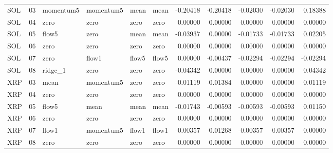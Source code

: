 \begin{longtable}{llllllrrrrr}
SOL & 03 & momentum5 & momentum5 & mean & mean & -0.20418 & -0.20418 & -0.02030 & -0.02030 & 0.18388 \\
SOL & 04 & zero & zero & zero & zero & 0.00000 & 0.00000 & 0.00000 & 0.00000 & 0.00000 \\
SOL & 05 & flow5 & zero & mean & mean & -0.03937 & 0.00000 & -0.01733 & -0.01733 & 0.02205 \\
SOL & 06 & zero & zero & zero & zero & 0.00000 & 0.00000 & 0.00000 & 0.00000 & 0.00000 \\
SOL & 07 & zero & flow1 & flow5 & flow5 & 0.00000 & -0.00437 & -0.02294 & -0.02294 & -0.02294 \\
SOL & 08 & ridge\_1 & zero & zero & zero & -0.04342 & 0.00000 & 0.00000 & 0.00000 & 0.04342 \\
XRP & 03 & mean & momentum5 & zero & zero & -0.01119 & -0.01384 & 0.00000 & 0.00000 & 0.01119 \\
XRP & 04 & zero & zero & zero & zero & 0.00000 & 0.00000 & 0.00000 & 0.00000 & 0.00000 \\
XRP & 05 & flow5 & mean & mean & mean & -0.01743 & -0.00593 & -0.00593 & -0.00593 & 0.01150 \\
XRP & 06 & zero & zero & zero & zero & 0.00000 & 0.00000 & 0.00000 & 0.00000 & 0.00000 \\
XRP & 07 & flow1 & momentum5 & flow1 & flow1 & -0.00357 & -0.01268 & -0.00357 & -0.00357 & 0.00000 \\
XRP & 08 & zero & zero & zero & zero & 0.00000 & 0.00000 & 0.00000 & 0.00000 & 0.00000 \\
\bottomrule
\end{longtable}
